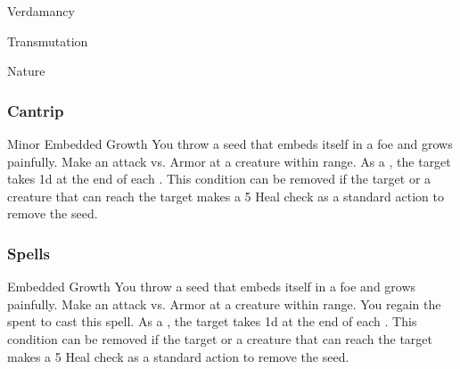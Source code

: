 \newpage
\begin{spellsection}{Verdamancy}

\begin{spellheader}
\end{spellheader}


 Transmutation

 Nature

\subsubsection{Cantrip}


\begin{freeability}{Minor Embedded Growth}
You throw a seed that embeds itself in a foe and grows painfully.
Make an attack vs. Armor at a creature within \rngclose range.
\hit As a , the target takes  \minus1d at the end of each .
This condition can be removed if the target or a creature that can reach the target makes a  5 Heal check as a standard action to remove the seed.
\end{freeability}

\end{spellsection}


\subsubsection{Spells}


\lowercase{\hypertarget{spell:Embedded Growth}{}}\label{spell:Embedded Growth}
\begin{apability}[\nth{1}]{\hypertarget{spell:Embedded Growth}{Embedded Growth}}
You throw a seed that embeds itself in a foe and grows painfully.
Make an attack vs. Armor at a creature within \rngclose range.
\miss You regain the  spent to cast this spell.
\hit As a , the target takes  \plus1d at the end of each .
This condition can be removed if the target or a creature that can reach the target makes a  5 Heal check as a standard action to remove the seed.
\end{apability}
\vspace{0.25em}



